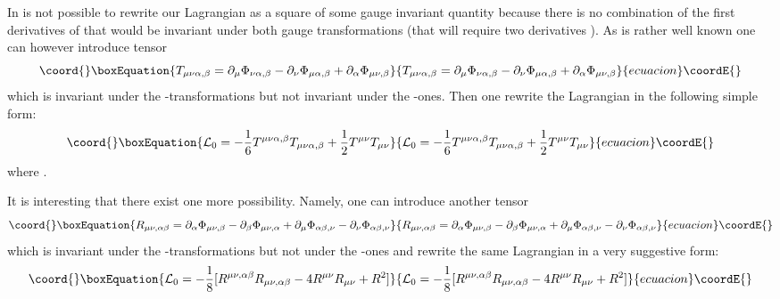 \documentclass[a4paper,12pt]{article}
\begin{document}
In is not possible to rewrite our Lagrangian as a square of some gauge
invariant quantity because there is no combination of the first
derivatives of \myHighlight{$\Phi_{[\mu\nu],\alpha}$}\coordHE{} that would be invariant
under both gauge transformations (that will require two derivatives 
\cite{BB02,MH02}). As is rather well known one can however introduce tensor
\coordHE{}
\begin{equation}\coord{}\boxEquation{
T_{\mu\nu\alpha,\beta} = \partial_\mu \Phi_{\nu\alpha,\beta} - \partial_\nu
\Phi_{\mu\alpha,\beta} + \partial_\alpha \Phi_{\mu\nu,\beta}
}{
T_{\mu\nu\alpha,\beta} = \partial_\mu \Phi_{\nu\alpha,\beta} - \partial_\nu
\Phi_{\mu\alpha,\beta} + \partial_\alpha \Phi_{\mu\nu,\beta}
}{ecuacion}\coordE{}\end{equation}
which is invariant under the \coordHE{}-transformations but not
invariant under the \coordHE{}-ones. Then one rewrite the Lagrangian
in the following simple form:
\begin{equation}\coord{}\boxEquation{
{\cal L}_0 = - \frac{1}{6} T^{\mu\nu\alpha,\beta} T_{\mu\nu\alpha,\beta}
+ \frac{1}{2} T^{\mu\nu} T_{\mu\nu}
}{
{\cal L}_0 = - \frac{1}{6} T^{\mu\nu\alpha,\beta} T_{\mu\nu\alpha,\beta}
+ \frac{1}{2} T^{\mu\nu} T_{\mu\nu}
}{ecuacion}\coordE{}\end{equation}
where \coordHE{}.

It is interesting that there exist one more possibility. Namely, one can
introduce another tensor \coordHE{}
\begin{equation}\coord{}\boxEquation{
R_{\mu\nu,\alpha\beta} = \partial_\alpha \Phi_{\mu\nu,\beta} - \partial_\beta
\Phi_{\mu\nu,\alpha} + \partial_\mu \Phi_{\alpha\beta,\nu} - \partial_\nu
\Phi_{\alpha\beta,\nu}
}{
R_{\mu\nu,\alpha\beta} = \partial_\alpha \Phi_{\mu\nu,\beta} - \partial_\beta
\Phi_{\mu\nu,\alpha} + \partial_\mu \Phi_{\alpha\beta,\nu} - \partial_\nu
\Phi_{\alpha\beta,\nu}
}{ecuacion}\coordE{}\end{equation}
which is invariant under the \coordHE{}-transformations but not
under the \coordHE{}-ones and rewrite the same Lagrangian in a
very suggestive form:
\begin{equation}\coord{}\boxEquation{
{\cal L}_0 = - \frac{1}{8} [ R^{\mu\nu,\alpha\beta} R_{\mu\nu,\alpha\beta}
- 4 R^{\mu\nu} R_{\mu\nu} + R^2 ]
}{
{\cal L}_0 = - \frac{1}{8} [ R^{\mu\nu,\alpha\beta} R_{\mu\nu,\alpha\beta}
- 4 R^{\mu\nu} R_{\mu\nu} + R^2 ]
}{ecuacion}\coordE{}\end{equation}
\end{document}
